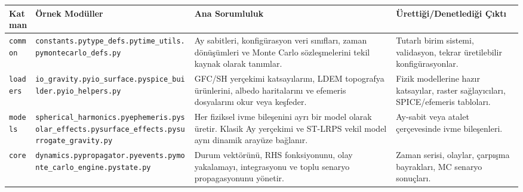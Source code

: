 \begingroup
\footnotesize
\begin{longtable}{>{\raggedright\arraybackslash}p{}
                  >{\raggedright\arraybackslash}p{}
                  >{\raggedright\arraybackslash}p{}
                  >{\raggedright\arraybackslash}p{}}
\toprule
\textbf{Katman} & \textbf{Örnek Modüller} & \textbf{Ana Sorumluluk} & \textbf{Ürettiği/Denetlediği Çıktı} \\
\midrule
\endhead
\texttt{common} &
\texttt{constants.py}\newline \texttt{type\_defs.py}\newline \texttt{time\_utils.py}\newline \texttt{montecarlo\_defs.py} &
Ay sabitleri, konfigürasyon veri sınıfları, zaman dönüşümleri ve Monte Carlo sözleşmelerini tekil kaynak olarak tanımlar. &
Tutarlı birim sistemi, validasyon, tekrar üretilebilir konfigürasyonlar. \\
\texttt{loaders} &
\texttt{io\_gravity.py}\newline \texttt{io\_surface.py}\newline \texttt{spice\_builder.py}\newline \texttt{io\_helpers.py} &
GFC/SH yerçekimi katsayılarını, LDEM topografya ürünlerini, albedo haritalarını ve efemeris dosyalarını okur veya keşfeder. &
Fizik modellerine hazır katsayılar, raster sağlayıcıları, SPICE/efemeris tabloları. \\
\texttt{models} &
\texttt{spherical\_harmonics.py}\newline \texttt{ephemeris.py}\newline \texttt{solar\_effects.py}\newline \texttt{surface\_effects.py}\newline \texttt{surrogate\_gravity.py} &
Her fiziksel ivme bileşenini ayrı bir model olarak üretir. Klasik Ay yerçekimi ve ST-LRPS vekil model aynı dinamik arayüze bağlanır. &
Ay-sabit veya atalet çerçevesinde ivme bileşenleri. \\
\texttt{core} &
\texttt{dynamics.py}\newline \texttt{propagator.py}\newline \texttt{events.py}\newline \texttt{monte\_carlo\_engine.py}\newline \texttt{state.py} &
Durum vektörünü, RHS fonksiyonunu, olay yakalamayı, integrasyonu ve toplu senaryo propagasyonunu yönetir. &
Zaman serisi, olaylar, çarpışma bayrakları, MC senaryo sonuçları. \\

\end{longtable}
